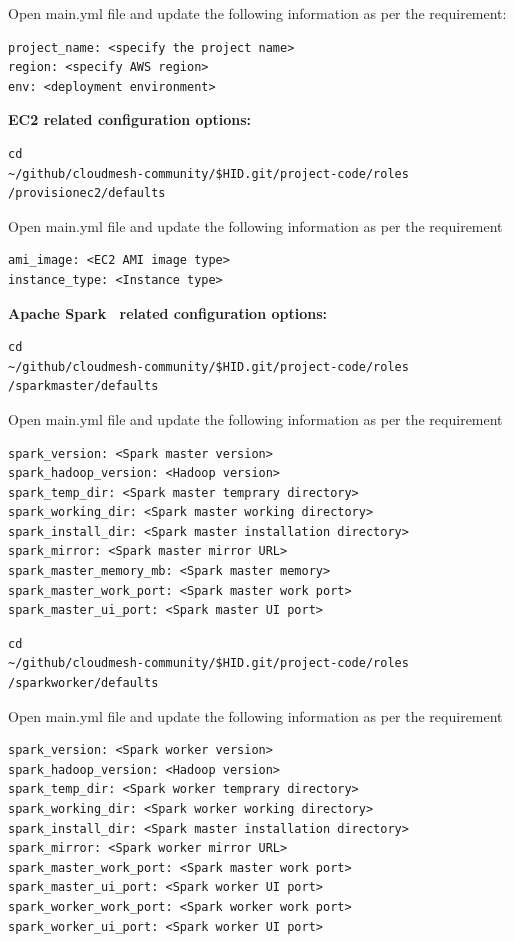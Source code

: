 Open main.yml file and update the following information as per the
requirement:

\begin{verbatim}
project_name: <specify the project name>
region: <specify AWS region>
env: <deployment environment>
\end{verbatim}

\textbf{EC2 related configuration options:}

\begin{verbatim}
cd
~/github/cloudmesh-community/$HID.git/project-code/roles
/provisionec2/defaults
\end{verbatim}

Open main.yml file and update the following information as per the
requirement

\begin{verbatim}
ami_image: <EC2 AMI image type>
instance_type: <Instance type>
\end{verbatim}

\textbf{Apache Spark~\cite{hid-sp18-511-www-spark} related configuration options:}

\begin{verbatim}
cd
~/github/cloudmesh-community/$HID.git/project-code/roles
/sparkmaster/defaults
\end{verbatim}

Open main.yml file and update the following information as per the
requirement

\begin{verbatim}
spark_version: <Spark master version>
spark_hadoop_version: <Hadoop version>
spark_temp_dir: <Spark master temprary directory>
spark_working_dir: <Spark master working directory>
spark_install_dir: <Spark master installation directory>
spark_mirror: <Spark master mirror URL>
spark_master_memory_mb: <Spark master memory>
spark_master_work_port: <Spark master work port>
spark_master_ui_port: <Spark master UI port>
\end{verbatim}

\begin{verbatim}
cd
~/github/cloudmesh-community/$HID.git/project-code/roles
/sparkworker/defaults
\end{verbatim}

Open main.yml file and update the following information as per the
requirement

\begin{verbatim}
spark_version: <Spark worker version>
spark_hadoop_version: <Hadoop version>
spark_temp_dir: <Spark worker temprary directory>
spark_working_dir: <Spark worker working directory>
spark_install_dir: <Spark master installation directory>
spark_mirror: <Spark worker mirror URL>
spark_master_work_port: <Spark master work port>
spark_master_ui_port: <Spark worker UI port>
spark_worker_work_port: <Spark worker work port>
spark_worker_ui_port: <Spark worker UI port>
\end{verbatim}


